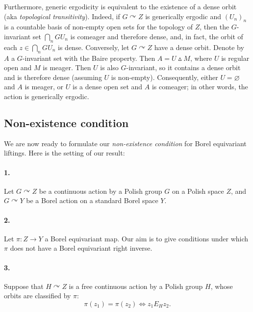 \documentclass[12pt]{paper}
\numberwithin{equation}{section}
\theoremstyle{plain}
\theoremstyle{definition}
\newcommand{\acts}{\curvearrowright}
\newcommand{\symd}{\vartriangle}
\begin{document}
Furthermore, generic ergodicity is equivalent to the existence of a dense orbit (aka
\emph{topological transitivity}).  Indeed, if \(G \acts Z\) is generically ergodic and \((U_n)_n\)
is a countable basis of non-empty open sets for the topology of \(Z\), then the \(G\)-invariant set
\(\bigcap_n GU_n\) is comeager and therefore dense, and, in fact, the orbit of each
\(z\in \bigcap_n GU_n\) is dense. Conversely, let \(G \curvearrowright Z\) have a dense
orbit. Denote by \(A\) a \(G\)-invariant set with the Baire property.  Then \(A = U \symd M\), where
\(U\) is regular open and \(M\) is meager.  Then \(U\) is also \(G\)-invariant, so it contains a
dense orbit and is therefore dense (assuming \(U\) is non-empty). Consequently, either
\(U = \varnothing\) and \(A\) is meager, or \(U\) is a dense open set and \(A\) is comeager; in
other words, the action is generically ergodic.





\subsection{Non-existence condition}
\label{subsect:non-exist}
We are now ready to formulate our \emph{non-existence condition} for Borel equivariant liftings.
Here is the setting of our result:


\paragraph{1.}
Let \(G\acts Z\) be a continuous action by a Polish group \(G\) on a Polish space \(Z\), and
\(G\acts Y\) be a Borel action on a standard Borel space \(Y\).

\paragraph{2.}
Let \(\pi: Z\to Y\) a Borel equivariant map.  Our aim is to give conditions under which \(\pi\) does
not have a Borel equivariant right inverse.

\paragraph{3.}
Suppose that \(H\acts Z\) is a free continuous action by a Polish group \(H\), whose orbits are
classified by \(\pi\):
\begin{equation}\label{eq:pi-H}
  \pi (z_1)=\pi(z_2) \Longleftrightarrow z_1 E_H z_2.
\end{equation}
\end{document}

